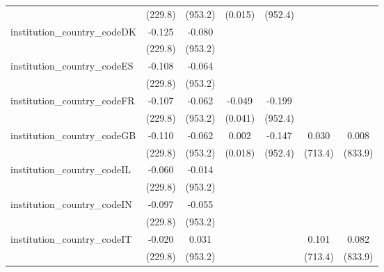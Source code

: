 \begin{tabular}{lcccccc}
                                         & (229.8)        & (953.2)       & (0.015)        & (952.4)       &               &   \\   
   institution\_country\_codeDK          & -0.125         & -0.080        &                &               &               &   \\   
                                         & (229.8)        & (953.2)       &                &               &               &   \\   
   institution\_country\_codeES          & -0.108         & -0.064        &                &               &               &   \\   
                                         & (229.8)        & (953.2)       &                &               &               &   \\   
   institution\_country\_codeFR          & -0.107         & -0.062        & -0.049         & -0.199        &               &   \\   
                                         & (229.8)        & (953.2)       & (0.041)        & (952.4)       &               &   \\   
   institution\_country\_codeGB          & -0.110         & -0.062        & 0.002          & -0.147        & 0.030         & 0.008\\   
                                         & (229.8)        & (953.2)       & (0.018)        & (952.4)       & (713.4)       & (833.9)\\   
   institution\_country\_codeIL          & -0.060         & -0.014        &                &               &               &   \\   
                                         & (229.8)        & (953.2)       &                &               &               &   \\   
   institution\_country\_codeIN          & -0.097         & -0.055        &                &               &               &   \\   
                                         & (229.8)        & (953.2)       &                &               &               &   \\   
   institution\_country\_codeIT          & -0.020         & 0.031         &                &               & 0.101         & 0.082\\   
                                         & (229.8)        & (953.2)       &                &               & (713.4)       & (833.9)\\   

\end{tabular}
